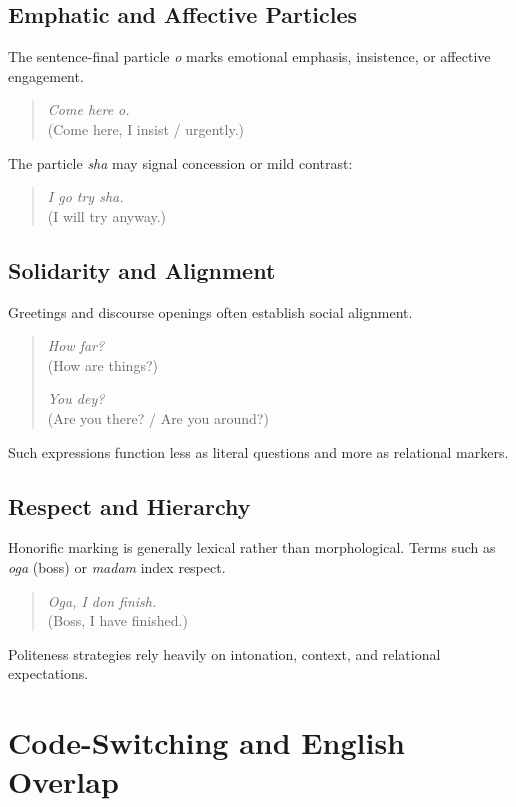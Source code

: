 \documentclass[12pt]{article}
\begin{document}
\subsection{Emphatic and Affective Particles}

The sentence-final particle \textit{o} marks emotional emphasis, insistence, or affective engagement.

\begin{quote}
\textit{Come here o.} \\
(Come here, I insist / urgently.)
\end{quote}

The particle \textit{sha} may signal concession or mild contrast:

\begin{quote}
\textit{I go try sha.} \\
(I will try anyway.)
\end{quote}

\subsection{Solidarity and Alignment}

Greetings and discourse openings often establish social alignment.

\begin{quote}
\textit{How far?} \\
(How are things?)

\textit{You dey?} \\
(Are you there? / Are you around?)
\end{quote}

Such expressions function less as literal questions and more as relational markers.

\subsection{Respect and Hierarchy}

Honorific marking is generally lexical rather than morphological. Terms such as \textit{oga} (boss) or \textit{madam} index respect.

\begin{quote}
\textit{Oga, I don finish.} \\
(Boss, I have finished.)
\end{quote}

Politeness strategies rely heavily on intonation, context, and relational expectations.

\section{Code-Switching and English Overlap}
\end{document}
